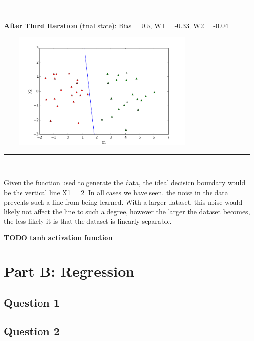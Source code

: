 \documentclass{article}
\begin{document}
\begin{center}
\vspace{2mm}
\rule{8cm}{0.4pt} \\
\vspace{2mm}
\textbf{After Third Iteration} (final state): Bias = 0.5, W1 = -0.33, W2 = -0.04 \\
\centerline{\includegraphics[width=400px, height=220px]{partA2_iter3}}
\vspace{2mm}
\rule{8cm}{0.4pt} \\
\vspace{2mm}
\end{center}

\noindent Given the function used to generate the data, the ideal decision boundary would be the vertical line X1 = 2. In all cases we have seen, the noise in the data prevents such a line from being learned. With a larger dataset, this noise would likely not affect the line to such a degree, however the larger the dataset becomes, the less likely it is that the dataset is linearly separable.

\textbf{TODO tanh activation function}
\section*{Part B: Regression}
\subsection*{Question 1}

\subsection*{Question 2}
\end{document}
